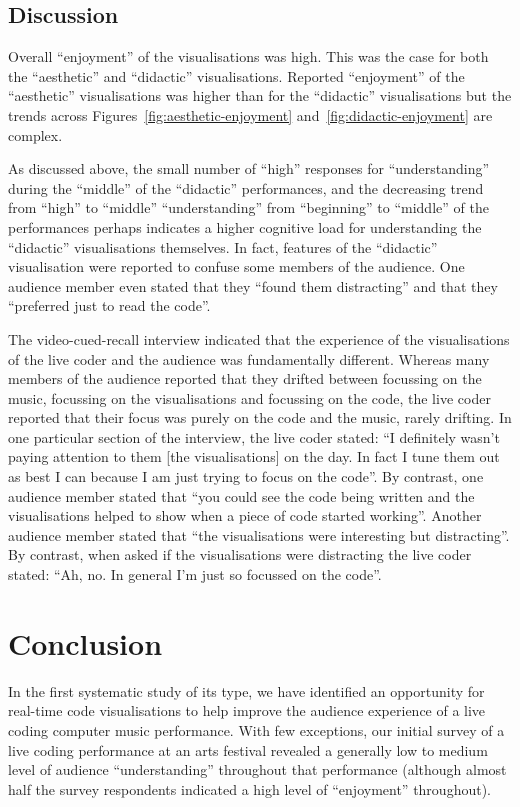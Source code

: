 \documentclass{sig-alternate}
\begin{document}
\subsection{Discussion}

Overall ``enjoyment'' of the visualisations was high. This was the
case for both the ``aesthetic'' and ``didactic'' visualisations.
Reported ``enjoyment'' of the ``aesthetic'' visualisations was higher
than for the ``didactic'' visualisations but the trends across
Figures~\ref{fig:aesthetic-enjoyment} and~\ref{fig:didactic-enjoyment}
are complex.

As discussed above, the small number of ``high'' responses for
``understanding'' during the ``middle'' of the ``didactic''
performances, and the decreasing trend from ``high'' to ``middle''
``understanding'' from ``beginning'' to ``middle'' of the performances
perhaps indicates a higher cognitive load for understanding the
``didactic'' visualisations themselves. In fact, features of the
``didactic'' visualisation were reported to confuse some members of
the audience. One audience member even stated that they ``found them
distracting'' and that they ``preferred just to read the code''.

The video-cued-recall interview indicated that the experience of the
visualisations of the live coder and the audience was fundamentally
different. Whereas many members of the audience reported that they
drifted between focussing on the music, focussing on the
visualisations and focussing on the code, the live coder reported that
their focus was purely on the code and the music, rarely drifting. In
one particular section of the interview, the live coder stated: ``I
definitely wasn't paying attention to them [the visualisations] on the
day. In fact I tune them out as best I can because I am just trying to
focus on the code''. By contrast, one audience member stated that
``you could see the code being written and the visualisations helped
to show when a piece of code started working''. Another audience
member stated that ``the visualisations were interesting but
distracting''. By contrast, when asked if the visualisations were
distracting the live coder stated: ``Ah, no. In general I'm just so
focussed on the code''.

\section{Conclusion}

In the first systematic study of its type, we have identified an
opportunity for real-time code visualisations to help improve the
audience experience of a live coding computer music performance. With
few exceptions, our initial survey of a live coding performance at an
arts festival revealed a generally low to medium level of audience
``understanding'' throughout that performance (although almost half
the survey respondents indicated a high level of ``enjoyment''
throughout).
\end{document}
